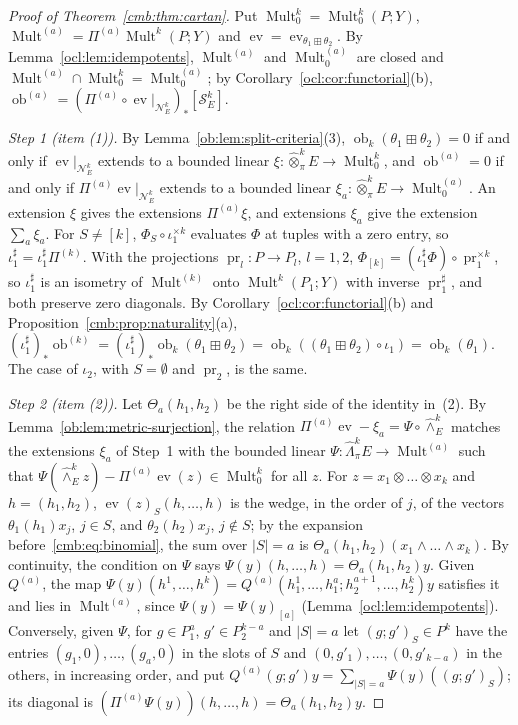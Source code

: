\documentclass[11pt]{amsart}
\theoremstyle{definition}
\theoremstyle{remark}
\numberwithin{equation}{section}
\newcommand{\Mult}{\operatorname{Mult}}
\newcommand{\abs}[1]{\lvert #1\rvert}
\theoremstyle{plain}
\theoremstyle{definition}
\theoremstyle{plain}
\newcommand{\ev}{\operatorname{ev}}
\newcommand{\ob}{\operatorname{ob}}
\newcommand{\cN}{\mathcal N}
\newcommand{\cS}{\mathcal S}
\begin{document}
\begin{proof}[Proof of Theorem~\ref{cmb:thm:cartan}]
Put $\Mult^k_0=\Mult^k_0(P;Y)$, $\Mult^{(a)}=\Pi^{(a)}\Mult^k(P;Y)$ and
$\ev=\ev_{\theta_1\boxplus\theta_2}$. By
Lemma~\ref{ocl:lem:idempotents}, $\Mult^{(a)}$ and $\Mult^{(a)}_0$ are closed and
$\Mult^{(a)}\cap\Mult^k_0=\Mult^{(a)}_0$; by Corollary~\ref{ocl:cor:functorial}(b),
$\ob^{(a)}=(\Pi^{(a)}\circ\ev|_{\cN^k_E})_*[\cS^k_E]$.

\emph{Step 1 (item (1)).} By Lemma~\ref{ob:lem:split-criteria}(3), $\ob_k(\theta_1\boxplus\theta_2)=0$ if and only if
$\ev|_{\cN^k_E}$ extends to a bounded linear $\xi\colon\widehat\otimes^k_\pi E\to\Mult^k_0$, and $\ob^{(a)}=0$ if and
only if $\Pi^{(a)}\ev|_{\cN^k_E}$ extends to a bounded linear $\xi_a\colon\widehat\otimes^k_\pi E\to\Mult^{(a)}_0$. An
extension $\xi$ gives the extensions $\Pi^{(a)}\xi$, and extensions $\xi_a$ give the extension $\sum_a\xi_a$. For
$S\ne[k]$, $\Phi_S\circ\iota_1^{\times k}$ evaluates $\Phi$ at tuples with a zero entry, so
$\iota_1^\sharp=\iota_1^\sharp\Pi^{(k)}$. With the projections $\operatorname{pr}_l\colon P\to P_l$, $l=1,2$,
$\Phi_{[k]}=(\iota_1^\sharp\Phi)\circ\operatorname{pr}_1^{\times k}$, so $\iota_1^\sharp$ is an isometry of $\Mult^{(k)}$
onto $\Mult^k(P_1;Y)$ with inverse $\operatorname{pr}_1^\sharp$, and both preserve zero diagonals. By
Corollary~\ref{ocl:cor:functorial}(b) and Proposition~\ref{cmb:prop:naturality}(a),
$(\iota_1^\sharp)_*\ob^{(k)}=(\iota_1^\sharp)_*\ob_k(\theta_1\boxplus\theta_2)=\ob_k((\theta_1\boxplus\theta_2)\circ\iota_1)=\ob_k(\theta_1)$.
The case of $\iota_2$, with $S=\emptyset$ and $\operatorname{pr}_2$, is the same.

\emph{Step 2 (item (2)).} Let $\Theta_a(h_1,h_2)$ be the right side of the identity in~(2). By
Lemma~\ref{ob:lem:metric-surjection}, the relation $\Pi^{(a)}\ev-\xi_a=\Psi\circ\widehat\wedge^k_E$ matches the
extensions $\xi_a$ of Step~1 with the bounded linear $\Psi\colon\widehat\Lambda^k_\pi E\to\Mult^{(a)}$ such that
$\Psi(\widehat\wedge^k_Ez)-\Pi^{(a)}\ev(z)\in\Mult^k_0$ for all $z$. For $z=x_1\otimes\dots\otimes x_k$ and
$h=(h_1,h_2)$, $\ev(z)_S(h,\dots,h)$ is the wedge, in the order of $j$, of the vectors $\theta_1(h_1)x_j$, $j\in S$, and
$\theta_2(h_2)x_j$, $j\notin S$; by the expansion before~\eqref{cmb:eq:binomial}, the sum over $\abs S=a$ is
$\Theta_a(h_1,h_2)(x_1\wedge\dots\wedge x_k)$. By continuity, the condition on $\Psi$ says
$\Psi(y)(h,\dots,h)=\Theta_a(h_1,h_2)y$. Given $Q^{(a)}$, the map
$\Psi(y)(h^1,\dots,h^k)=Q^{(a)}(h^1_1,\dots,h^a_1;h^{a+1}_2,\dots,h^k_2)y$ satisfies it and lies in $\Mult^{(a)}$, since
$\Psi(y)=\Psi(y)_{[a]}$ (Lemma~\ref{ocl:lem:idempotents}). Conversely, given $\Psi$, for $g\in P_1^a$, $g'\in
P_2^{k-a}$ and $\abs S=a$ let $(g;g')_S\in P^k$ have the entries $(g_1,0),\dots,(g_a,0)$ in the slots of $S$ and
$(0,g'_1),\dots,(0,g'_{k-a})$ in the others, in increasing order, and put $Q^{(a)}(g;g')y=\sum_{\abs
S=a}\Psi(y)((g;g')_S)$; its diagonal is $(\Pi^{(a)}\Psi(y))(h,\dots,h)=\Theta_a(h_1,h_2)y$.


\end{proof}
\end{document}
